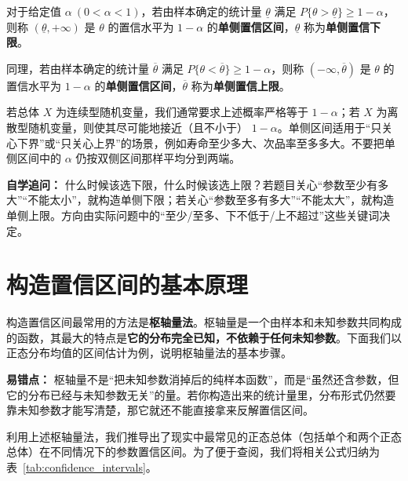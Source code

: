 ﻿\documentclass[lang=cn,11pt]{elegantbook}
\begin{document}
\begin{definition}[单侧置信区间] \label{def:one_sided_confidence_interval}
对于给定值 $\alpha\ (0<\alpha<1)$，若由样本确定的统计量 $\underline{\theta}$ 满足 $P\{\theta > \underline{\theta}\} \ge 1-\alpha$，则称 $(\underline{\theta},+\infty)$ 是 $\theta$ 的置信水平为 $1-\alpha$ 的\textbf{单侧置信区间}，$\underline{\theta}$ 称为\textbf{单侧置信下限}。

同理，若由样本确定的统计量 $\overline{\theta}$ 满足 $P\{\theta < \overline{\theta}\} \ge 1-\alpha$，则称 $(-\infty,\overline{\theta})$ 是 $\theta$ 的置信水平为 $1-\alpha$ 的\textbf{单侧置信区间}，$\overline{\theta}$ 称为\textbf{单侧置信上限}。
\end{definition}

\begin{note}
若总体 $X$ 为连续型随机变量，我们通常要求上述概率严格等于 $1-\alpha$；若 $X$ 为离散型随机变量，则使其尽可能地接近（且不小于） $1-\alpha$。单侧区间适用于“只关心下界”或“只关心上界”的场景，例如寿命至少多大、次品率至多多大。不要把单侧区间中的 \(\alpha\) 仍按双侧区间那样平均分到两端。
\end{note}

\begin{note}
\textbf{自学追问：} 什么时候该选下限，什么时候该选上限？若题目关心“参数至少有多大”“不能太小”，就构造单侧下限；若关心“参数至多有多大”“不能太大”，就构造单侧上限。方向由实际问题中的“至少/至多、下不低于/上不超过”这些关键词决定。
\end{note}

\section{构造置信区间的基本原理}

构造置信区间最常用的方法是\textbf{枢轴量法}。枢轴量是一个由样本和未知参数共同构成的函数，其最大的特点是\textbf{它的分布完全已知，不依赖于任何未知参数}。下面我们以正态分布均值的区间估计为例，说明枢轴量法的基本步骤。

\begin{note}
\textbf{易错点：} 枢轴量不是“把未知参数消掉后的纯样本函数”，而是“虽然还含参数，但它的分布已经与未知参数无关”的量。若你构造出来的统计量里，分布形式仍然要靠未知参数才能写清楚，那它就还不能直接拿来反解置信区间。
\end{note}

利用上述枢轴量法，我们推导出了现实中最常见的正态总体（包括单个和两个正态总体）在不同情况下的参数置信区间。为了便于查阅，我们将相关公式归纳为表~\ref{tab:confidence_intervals}。
\end{document}
